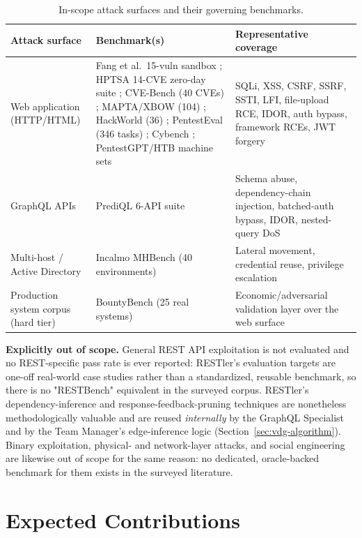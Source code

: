 \begin{table}[htbp]
\centering
\small
\caption{In-scope attack surfaces and their governing benchmarks.}
\label{tab:in-scope-surfaces}
\begin{tabular}{@{}p{3.1cm}p{5.6cm}p{5.6cm}@{}}
\toprule
\textbf{Attack surface} & \textbf{Benchmark(s)} & \textbf{Representative coverage} \\
\midrule
Web application (HTTP/HTML) & Fang et al.\ 15-vuln sandbox \citep{fang2024oneday}; HPTSA 14-CVE zero-day suite \citep{zhu2024hptsa}; CVE-Bench (40 CVEs) \citep{zhu2025cvebench}; MAPTA/XBOW (104) \citep{david2025mapta}; HackWorld (36) \citep{ren2025hackworld}; PentestEval (346 tasks) \citep{yang2025pentesteval}; Cybench \citep{zhang2025cybench}; PentestGPT/HTB machine sets \citep{deng2024pentestgpt} & SQLi, XSS, CSRF, SSRF, SSTI, LFI, file-upload RCE, IDOR, auth bypass, framework RCEs, JWT forgery \\
GraphQL APIs & PrediQL 6-API suite \citep{liu2025prediql} & Schema abuse, dependency-chain injection, batched-auth bypass, IDOR, nested-query DoS \\
Multi-host / Active Directory & Incalmo MHBench (40 environments) \citep{singer2025incalmo} & Lateral movement, credential reuse, privilege escalation \\
Production system corpus (hard tier) & BountyBench (25 real systems) \citep{zhang2025bountybench} & Economic/adversarial validation layer over the web surface \\
\bottomrule
\end{tabular}
\end{table}

\textbf{Explicitly out of scope.} General REST API exploitation is not evaluated and no REST-specific pass rate is ever reported: RESTler's \citep{atlidakis2019restler} evaluation targets are one-off real-world case studies rather than a standardized, reusable benchmark, so there is no "RESTBench" equivalent in the surveyed corpus. RESTler's dependency-inference and response-feedback-pruning techniques are nonetheless methodologically valuable and are reused \emph{internally} by the GraphQL Specialist and by the Team Manager's edge-inference logic (Section~\ref{sec:vdg-algorithm}). Binary exploitation, physical- and network-layer attacks, and social engineering are likewise out of scope for the same reason: no dedicated, oracle-backed benchmark for them exists in the surveyed literature.

\section{Expected Contributions}
\label{sec:intro_contributions}
\label{sec:not-a-contribution}

